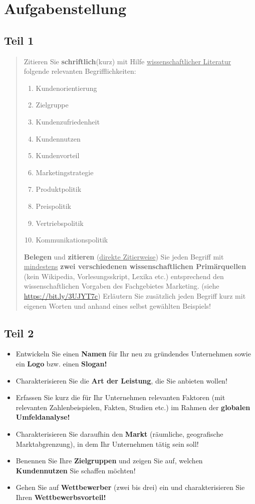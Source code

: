 \section{Aufgabenstellung}
	\subsection{Teil 1}
		\begin{abstract}
			\noindent Zitieren Sie \textbf{schriftlich}(kurz) mit Hilfe \underline{wissenschaftlicher Literatur} folgende relevanten
			Begrifflichkeiten:
			\begin{enumerate}
				\item Kundenorientierung
				\item Zielgruppe
				\item Kundenzufriedenheit
				\item Kundennutzen
				\item Kundenvorteil
				\item Marketingstrategie
				\item Produktpolitik
				\item Preispolitik
				\item Vertriebspolitik
				\item Kommunikationspolitik
			\end{enumerate}
			\textbf{Belegen} und \textbf{zitieren} (\underline{direkte Zitierweise}) Sie jeden Begriff mit \underline{mindestens}
			\textbf{zwei verschiedenen wissenschaftlichen Primärquellen} (kein Wikipedia, Vorlesungsskript, Lexika etc.) entsprechend den
			wissenschaftlichen Vorgaben des Fachgebietes Marketing. (siehe \url{https://bit.ly/3UJYT7c})
			\newline
			Erläutern Sie zusätzlich jeden Begriff kurz mit eigenen Worten und anhand eines selbst gewählten Beispiels!
		\end{abstract}
	\subsection{Teil 2}
		\begin{itemize}
			\item Entwickeln Sie einen \textbf{Namen} für Ihr neu zu gründendes Unternehmen sowie ein \textbf{Logo}
			bzw. einen \textbf{Slogan!}
			\item Charakterisieren Sie die \textbf{Art der Leistung}, die Sie anbieten wollen!
			\item Erfassen Sie kurz die für Ihr Unternehmen relevanten Faktoren (mit relevanten
			Zahlenbeispielen, Fakten, Studien etc.) im Rahmen der \textbf{globalen Umfeldanalyse!}
			\item Charakterisieren Sie daraufhin den \textbf{Markt} (räumliche, geografische
			Marktabgrenzung), in dem Ihr Unternehmen tätig sein soll!
			\item Benennen Sie Ihre \textbf{Zielgruppen} und zeigen Sie auf, welchen \textbf{Kundennutzen} Sie
			schaffen möchten!
			\item Gehen Sie auf \textbf{Wettbewerber} (zwei bis drei) ein und charakterisieren Sie Ihren
			\textbf{Wettbewerbsvorteil!}
		\end{itemize}
		\newpage
